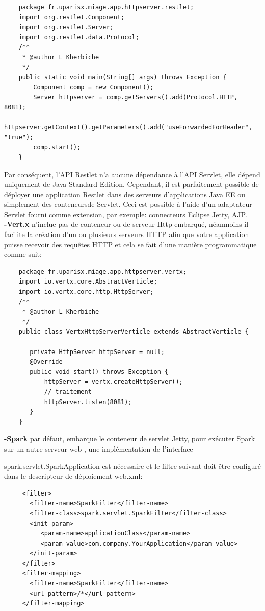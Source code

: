 \documentclass[12pt, a4paper, openany]{report}
\begin{document}
   \begin{lstlisting}
    package fr.uparisx.miage.app.httpserver.restlet;
    import org.restlet.Component;
    import org.restlet.Server;
    import org.restlet.data.Protocol;
    /**
     * @author L Kherbiche
     */
    public static void main(String[] args) throws Exception {
        Component comp = new Component();
        Server httpserver = comp.getServers().add(Protocol.HTTP, 8081);
        httpserver.getContext().getParameters().add("useForwardedForHeader", "true");
        comp.start();  
    }
   \end{lstlisting}   
   
   Par conséquent, l'API Restlet n'a aucune dépendance à l'API Servlet, elle dépend uniquement de Java Standard Edition. Cependant, il est parfaitement possible de déployer une application Restlet dans des serveurs d'applications Java EE ou simplement des conteneursde  Servlet. Ceci est possible à l'aide d'un adaptateur Servlet fourni comme extension, par exemple: connecteurs Eclipse Jetty, AJP.\\
   
   \textbf{-Vert.x} n'inclue pas de conteneur ou de serveur Http embarqué, néanmoins il facilite la création d'un ou plusieurs serveurs HTTP afin que votre application puisse recevoir des requêtes HTTP et cela se fait d'une manière programmatique comme suit:
   \begin{lstlisting}
    package fr.uparisx.miage.app.httpserver.vertx;
    import io.vertx.core.AbstractVerticle;
    import io.vertx.core.http.HttpServer;
    /**
     * @author L Kherbiche
     */
    public class VertxHttpServerVerticle extends AbstractVerticle {

       private HttpServer httpServer = null;
       @Override
       public void start() throws Exception {
           httpServer = vertx.createHttpServer();
           // traitement
           httpServer.listen(8081);
       }
    }
   \end{lstlisting}
   
   
   \textbf{-Spark} par défaut, embarque le conteneur de servlet Jetty, pour exécuter Spark sur un autre serveur web , une implémentation de l'interface
   
    spark.servlet.SparkApplication est nécessaire et le filtre suivant doit être configuré dans le descripteur de déploiement web.xml: \\
   
   \begin{lstlisting}
     <filter>
       <filter-name>SparkFilter</filter-name>
       <filter-class>spark.servlet.SparkFilter</filter-class>
       <init-param>
          <param-name>applicationClass</param-name>
          <param-value>com.company.YourApplication</param-value>
       </init-param>
     </filter>
     <filter-mapping>
       <filter-name>SparkFilter</filter-name>
       <url-pattern>/*</url-pattern>
     </filter-mapping>
   \end{lstlisting}
   
\end{document}
